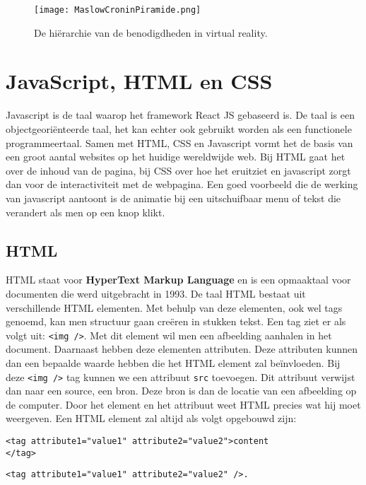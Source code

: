 \begin{figure}[h]
	\centering
	\texttt{[image: MaslowCroninPiramide.png]}
	\caption{De hiërarchie van de benodigdheden in virtual reality.}
	\label{fig:maslowcroninpiramide}
\end{figure}

\section{JavaScript, HTML en CSS}
\label{sec:frameworks}
Javascript is de taal waarop het framework React JS gebaseerd is. De taal is een objectgeoriënteerde taal, het kan echter ook gebruikt worden als een functionele programmeertaal. Samen met HTML, CSS en Javascript vormt het de basis van een groot aantal websites op het huidige wereldwijde web. Bij HTML gaat het over de inhoud van de pagina, bij CSS over hoe het eruitziet en javascript zorgt dan voor de interactiviteit met de webpagina. Een goed voorbeeld die de werking van javascript aantoont is de animatie bij een uitschuifbaar menu of tekst die verandert als men op een knop klikt.

\subsection{HTML}
HTML staat voor \textbf{HyperText Markup Language} en is een opmaaktaal voor documenten die werd uitgebracht in 1993. De taal HTML bestaat uit verschillende HTML elementen. Met behulp van deze elementen, ook wel tags genoemd, kan men structuur gaan creëren in stukken tekst. Een tag ziet er als volgt uit: \lstinline[basicstyle=\ttfamily\color{red}]|<img />|. Met dit element wil men een afbeelding aanhalen in het document. Daarnaast hebben deze elementen attributen. Deze attributen kunnen dan een bepaalde waarde hebben die het HTML element zal beïnvloeden. Bij deze \lstinline[basicstyle=\ttfamily\color{red}]|<img />| tag kunnen we een attribuut \lstinline[basicstyle=\ttfamily\color{red}]|src| toevoegen. Dit attribuut verwijst dan naar een source, een bron. Deze bron is dan de locatie van een afbeelding op de computer. Door het element en het attribuut weet HTML precies wat hij moet weergeven. Een HTML element zal altijd als volgt opgebouwd zijn: 

\begin{lstlisting}[frame=single, caption=HTML Element voorbeeld]
<tag attribute1="value1" attribute2="value2">content
</tag>
\end{lstlisting}
\begin{lstlisting}[frame=single, caption=HTML Element voorbeeld]
<tag attribute1="value1" attribute2="value2" />.
\end{lstlisting}

